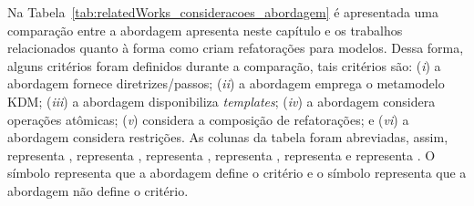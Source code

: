 Na Tabela~\ref{tab:relatedWorks_consideracoes_abordagem} é apresentada uma comparação entre a abordagem apresenta neste capítulo e os trabalhos relacionados quanto à forma como criam refatorações para modelos. Dessa forma, alguns critérios foram definidos durante a comparação, tais critérios são: (\textit{i}) a abordagem fornece diretrizes/passos; (\textit{ii}) a abordagem emprega o metamodelo KDM; (\textit{iii}) a abordagem disponibiliza \textit{templates}; (\textit{iv}) a abordagem considera operações atômicas; (\textit{v}) considera a composição de refatorações; e (\textit{vi}) a abordagem considera restrições. As colunas da tabela foram abreviadas, assim,  representa ,  representa ,  representa ,  representa ,  representa  e  representa . O símbolo  representa que a abordagem define o critério e o símbolo  representa que a abordagem não define o critério.


